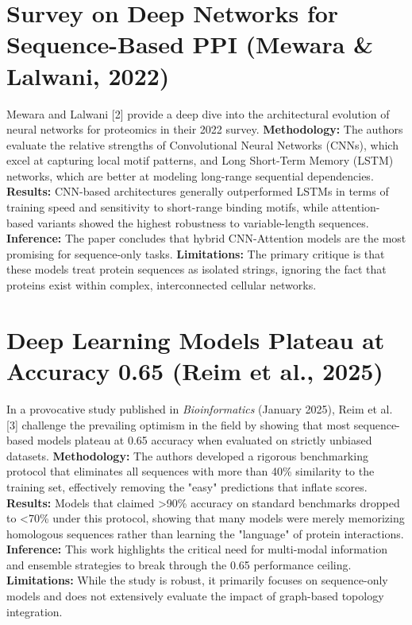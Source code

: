\documentclass[12pt,a4paper]{report}
\begin{document}
\section{Survey on Deep Networks for Sequence-Based PPI (Mewara \& Lalwani, 2022)}
Mewara and Lalwani [2] provide a deep dive into the architectural evolution of neural networks for proteomics in their 2022 survey.
\textbf{Methodology:} The authors evaluate the relative strengths of Convolutional Neural Networks (CNNs), which excel at capturing local motif patterns, and Long Short-Term Memory (LSTM) networks, which are better at modeling long-range sequential dependencies.
\textbf{Results:} CNN-based architectures generally outperformed LSTMs in terms of training speed and sensitivity to short-range binding motifs, while attention-based variants showed the highest robustness to variable-length sequences.
\textbf{Inference:} The paper concludes that hybrid CNN-Attention models are the most promising for sequence-only tasks.
\textbf{Limitations:} The primary critique is that these models treat protein sequences as isolated strings, ignoring the fact that proteins exist within complex, interconnected cellular networks.

\section{Deep Learning Models Plateau at Accuracy 0.65 (Reim et al., 2025)}
In a provocative study published in \textit{Bioinformatics} (January 2025), Reim et al. [3] challenge the prevailing optimism in the field by showing that most sequence-based models plateau at 0.65 accuracy when evaluated on strictly unbiased datasets.
\textbf{Methodology:} The authors developed a rigorous benchmarking protocol that eliminates all sequences with more than 40\% similarity to the training set, effectively removing the "easy" predictions that inflate scores.
\textbf{Results:} Models that claimed >90\% accuracy on standard benchmarks dropped to <70\% under this protocol, showing that many models were merely memorizing homologous sequences rather than learning the "language" of protein interactions.
\textbf{Inference:} This work highlights the critical need for multi-modal information and ensemble strategies to break through the 0.65 performance ceiling.
\textbf{Limitations:} While the study is robust, it primarily focuses on sequence-only models and does not extensively evaluate the impact of graph-based topology integration.
\end{document}
